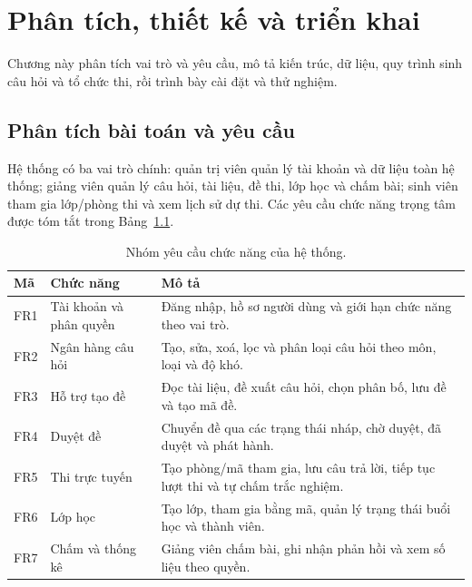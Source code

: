 \chapter{Phân tích, thiết kế và triển khai}
\label{ch:thietke}

\begin{muctieu}
Chương này phân tích vai trò và yêu cầu, mô tả kiến trúc, dữ liệu, quy
trình sinh câu hỏi và tổ chức thi, rồi trình bày cài đặt và thử nghiệm.
\end{muctieu}

\section{Phân tích bài toán và yêu cầu}

Hệ thống có ba vai trò chính: quản trị viên quản lý tài khoản và dữ liệu
toàn hệ thống; giảng viên quản lý câu hỏi, tài liệu, đề thi, lớp học và
chấm bài; sinh viên tham gia lớp/phòng thi và xem lịch sử dự thi. Các yêu
cầu chức năng trọng tâm được tóm tắt trong Bảng~\ref{tab:yeucau}.

\begin{table}[H]
\centering
\caption{Nhóm yêu cầu chức năng của hệ thống.}
\label{tab:yeucau}
\begin{tabular*}{\textwidth}{@{\extracolsep{\fill}}p{}p{}p{}}
\toprule
\rowcolor{gray100}\bfseries\color{daunavy}Mã & \bfseries\color{daunavy}Chức năng & \bfseries\color{daunavy}Mô tả \\
\midrule
FR1 & Tài khoản và phân quyền & Đăng nhập, hồ sơ người dùng và giới hạn chức năng theo vai trò. \\
FR2 & Ngân hàng câu hỏi & Tạo, sửa, xoá, lọc và phân loại câu hỏi theo môn, loại và độ khó. \\
FR3 & Hỗ trợ tạo đề & Đọc tài liệu, đề xuất câu hỏi, chọn phân bố, lưu đề và tạo mã đề. \\
FR4 & Duyệt đề & Chuyển đề qua các trạng thái nháp, chờ duyệt, đã duyệt và phát hành. \\
FR5 & Thi trực tuyến & Tạo phòng/mã tham gia, lưu câu trả lời, tiếp tục lượt thi và tự chấm trắc nghiệm. \\
FR6 & Lớp học & Tạo lớp, tham gia bằng mã, quản lý trạng thái buổi học và thành viên. \\
FR7 & Chấm và thống kê & Giảng viên chấm bài, ghi nhận phản hồi và xem số liệu theo quyền. \\
\bottomrule
\end{tabular*}
\end{table}


